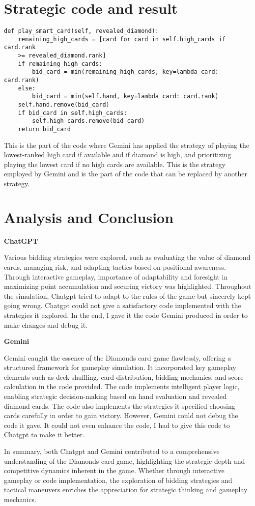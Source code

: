 \documentclass[11pt]{article}
\begin{document}
\section{Strategic code and result}

\begin{lstlisting}
def play_smart_card(self, revealed_diamond):
    remaining_high_cards = [card for card in self.high_cards if card.rank 
    >= revealed_diamond.rank]
    if remaining_high_cards:
        bid_card = min(remaining_high_cards, key=lambda card: card.rank)
    else:
        bid_card = min(self.hand, key=lambda card: card.rank)
    self.hand.remove(bid_card)
    if bid_card in self.high_cards:
        self.high_cards.remove(bid_card)
    return bid_card
\end{lstlisting}

This is the part of the code where Gemini has applied the strategy of playing the lowest-ranked high card if available and if diamond is high, and prioritizing playing the lowest card if no high cards are available. This is the strategy employed by Gemini and is the part of the code that can be replaced by another strategy.

\section{Analysis and Conclusion}

\textbf{ChatGPT}

Various bidding strategies were explored, such as evaluating the value of diamond cards, managing risk, and adapting tactics based on positional awareness. Through interactive gameplay, importance of adaptability and foresight in maximizing point accumulation and securing victory was highlighted. Throughout the simulation, Chatgpt tried to adapt to the rules of the game but sincerely kept going wrong. Chatgpt could not give a satisfactory code implemented with the strategies it explored. In the end, I gave it the code Gemini produced in order to make changes and debug it.
\vspace{10pt}

\textbf{Gemini}

Gemini caught the essence of the Diamonds card game flawlessly, offering a structured framework for gameplay simulation. It incorporated key gameplay elements such as deck shuffling, card distribution, bidding mechanics, and score calculation in the code provided. The code implements intelligent player logic, enabling strategic decision-making based on hand evaluation and revealed diamond cards. The code also implements the strategies it specified choosing cards carefully in order to gain victory. However, Gemini could not debug the code it gave. It could not even enhance the code, I had to give this code to Chatgpt to make it better.
\vspace{10pt}

In summary, both Chatgpt and Gemini contributed to a comprehensive understanding of the Diamonds card game, highlighting the strategic depth and competitive dynamics inherent in the game. Whether through interactive gameplay or code implementation, the exploration of bidding strategies and tactical maneuvers enriches the appreciation for strategic thinking and gameplay mechanics.
\end{document}
